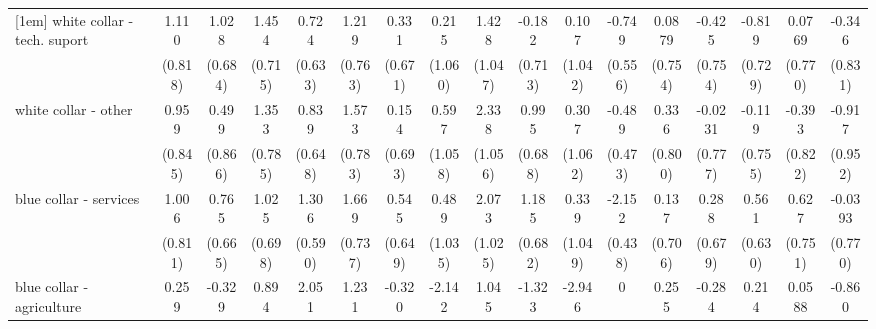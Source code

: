 {\begin{tabular}{l*{16}{c}}
[1em]
white collar - tech. suport&       1.110         &       1.028         &       1.454\sym{*}  &       0.724         &       1.219         &       0.331         &       0.215         &       1.428         &      -0.182         &       0.107         &      -0.749         &      0.0879         &      -0.425         &      -0.819         &      0.0769         &      -0.346         \\
                    &     (0.818)         &     (0.684)         &     (0.715)         &     (0.633)         &     (0.763)         &     (0.671)         &     (1.060)         &     (1.047)         &     (0.713)         &     (1.042)         &     (0.556)         &     (0.754)         &     (0.754)         &     (0.729)         &     (0.770)         &     (0.831)         \\
[1em]
white collar - other&       0.959         &       0.499         &       1.353         &       0.839         &       1.573\sym{*}  &       0.154         &       0.597         &       2.338\sym{*}  &       0.995         &       0.307         &      -0.489         &       0.336         &     -0.0231         &      -0.119         &      -0.393         &      -0.917         \\
                    &     (0.845)         &     (0.866)         &     (0.785)         &     (0.648)         &     (0.783)         &     (0.693)         &     (1.058)         &     (1.056)         &     (0.688)         &     (1.062)         &     (0.473)         &     (0.800)         &     (0.777)         &     (0.755)         &     (0.822)         &     (0.952)         \\
[1em]
blue collar - services&       1.006         &       0.765         &       1.025         &       1.306\sym{*}  &       1.669\sym{*}  &       0.545         &       0.489         &       2.073\sym{*}  &       1.185         &       0.339         &      -2.152\sym{***}&       0.137         &       0.288         &       0.561         &       0.627         &     -0.0393         \\
                    &     (0.811)         &     (0.665)         &     (0.698)         &     (0.590)         &     (0.737)         &     (0.649)         &     (1.035)         &     (1.025)         &     (0.682)         &     (1.049)         &     (0.438)         &     (0.706)         &     (0.679)         &     (0.630)         &     (0.751)         &     (0.770)         \\
[1em]
blue collar - agriculture&       0.259         &      -0.329         &       0.894         &       2.051\sym{**} &       1.231         &      -0.320         &      -2.142         &       1.045         &      -1.323         &      -2.946\sym{*}  &           0         &       0.255         &      -0.284         &       0.214         &      0.0588         &      -0.860         \\

\end{tabular}}
